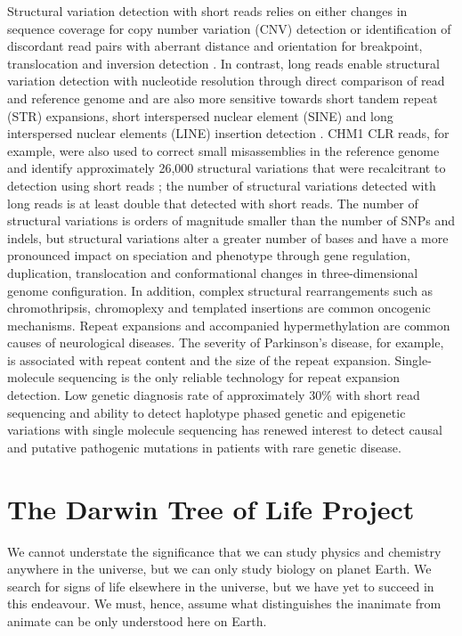 Structural variation detection with short reads relies on either changes in sequence coverage for copy number variation (CNV) detection or identification of discordant read pairs with aberrant distance and orientation for breakpoint, translocation and inversion detection \cite{Alkan2011-dv}. In contrast, long reads enable structural variation detection with nucleotide resolution through direct comparison of read and reference genome and are also more sensitive towards short tandem repeat (STR) expansions, short interspersed nuclear element (SINE) and long interspersed nuclear elements (LINE) insertion detection \cite{Chaisson2015-zz, Sedlazeck2018-oh, Denti2022-ux}. CHM1 CLR reads, for example, were also used to correct small misassemblies in the reference genome and identify approximately 26,000 structural variations that were recalcitrant to detection using short reads \cite{Chaisson2015-zz}; the number of structural variations detected with long reads is at least double that detected with short reads. The number of structural variations is orders of magnitude smaller than the number of SNPs and indels, but structural variations alter a greater number of bases and have a more pronounced impact on speciation and phenotype through gene regulation, duplication, translocation\cite{Weischenfeldt2013-tl} and conformational changes in three-dimensional genome configuration\cite{Spielmann2018-fm,}. In addition, complex structural rearrangements such as chromothripsis\cite{Stephens2011-gj, Korbel2013-to}, chromoplexy\cite{Baca2013-po} and templated insertions\cite{Yu2010-jr} are common oncogenic mechanisms. Repeat expansions and accompanied hypermethylation are common causes of neurological diseases\cite{Zhou2022-ci}. The severity of Parkinson’s disease, for example, is associated with repeat content and the size of the repeat expansion\cite{}. Single-molecule sequencing is the only reliable technology for repeat expansion detection. Low genetic diagnosis rate of approximately 30\% with short read sequencing and ability to detect haplotype phased genetic and epigenetic variations with single molecule sequencing has renewed interest to detect causal and putative pathogenic mutations in patients with rare genetic disease\cite{}. 

\section{The Darwin Tree of Life Project}

We cannot understate the significance that we can study physics and chemistry anywhere in the universe, but we can only study biology on planet Earth. We search for signs of life elsewhere in the universe, but we have yet to succeed in this endeavour. We must, hence, assume what distinguishes the inanimate from animate can be only understood here on Earth. 

